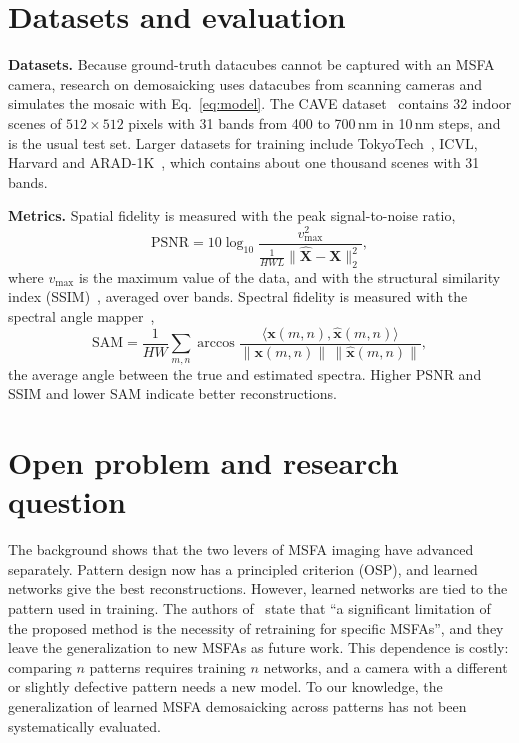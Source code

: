 \documentclass{article}
\def\X{{\mathbf X}}
\def\x{{\mathbf x}}
\begin{document}
\section{Datasets and evaluation}
\label{sec:eval}

\textbf{Datasets.} Because ground-truth datacubes cannot be captured with an
MSFA camera, research on demosaicking uses datacubes from scanning cameras and
simulates the mosaic with Eq.~\eqref{eq:model}. The CAVE
dataset~\cite{yasuma2010} contains 32 indoor scenes of $512\times512$ pixels
with 31 bands from 400 to 700\,nm in 10\,nm steps, and is the usual test set.
Larger datasets for training include TokyoTech~\cite{monno2015}, ICVL, Harvard
and ARAD-1K~\cite{arad2022}, which contains about one thousand scenes with 31
bands.

\textbf{Metrics.} Spatial fidelity is measured with the peak signal-to-noise
ratio,
\begin{equation}
  \mathrm{PSNR} = 10\log_{10}\frac{v_{\max}^2}{\frac{1}{HWL}\|\hat\X-\X\|_2^2},
\end{equation}
where $v_{\max}$ is the maximum value of the data, and with the structural
similarity index (SSIM)~\cite{wang2004}, averaged over bands. Spectral
fidelity is measured with the spectral angle mapper~\cite{kruse1993},
\begin{equation}
  \mathrm{SAM} = \frac{1}{HW}\sum_{m,n}\arccos
  \frac{\langle \x(m,n),\hat\x(m,n)\rangle}{\|\x(m,n)\|\,\|\hat\x(m,n)\|},
\end{equation}
the average angle between the true and estimated spectra. Higher PSNR and SSIM
and lower SAM indicate better reconstructions.

\section{Open problem and research question}
\label{sec:gap}

The background shows that the two levers of MSFA imaging have advanced
separately. Pattern design now has a principled criterion (OSP), and learned
networks give the best reconstructions. However, learned networks are tied to
the pattern used in training. The authors of~\cite{diaz2023} state that ``a
significant limitation of the proposed method is the necessity of retraining
for specific MSFAs'', and they leave the generalization to new MSFAs as
future work. This dependence is costly: comparing $n$ patterns requires
training $n$ networks, and a camera with a different or slightly defective
pattern needs a new model. To our knowledge, the generalization of learned
MSFA demosaicking across patterns has not been systematically evaluated.
\end{document}
